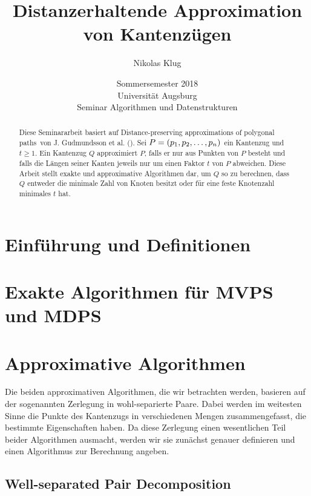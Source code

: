 \documentclass[11pt]{article}
\title{Distanzerhaltende Approximation von Kantenzügen}
\author{Nikolas Klug}
\date{Sommersemester 2018
	\\ Universität Augsburg
	\\ Seminar Algorithmen und Datenstrukturen
	}
\begin{document}
    \maketitle

    \begin{abstract}
        Diese Seminararbeit basiert auf \glqq Distance-preserving approximations of polygonal paths\grqq\ von J. Gudmundsson et al. (\cite{gudmundsson}). Sei $P = (p_1, p_2, \mathellipsis, p_n)$ ein Kantenzug und $t \geq 1$. Ein Kantenzug $Q$ approximiert $P$, falls er nur aus Punkten von $P$ besteht und falls die Längen seiner Kanten jeweils nur um einen Faktor $t$ von $P$ abweichen. Diese Arbeit stellt exakte und approximative Algorithmen dar, um $Q$ so zu berechnen, dass $Q$ entweder die minimale Zahl von Knoten besitzt oder für eine feste Knotenzahl 
        minimales $t$ hat.
    \end{abstract}

    \section{Einführung und Definitionen}
    \label{sec:intro}
	

    \section{Exakte Algorithmen für MVPS und MDPS}
    \label{sec:exact}
    
    
    \section{Approximative Algorithmen}
    \label{sec:approximative}
    
    Die beiden approximativen Algorithmen, die wir betrachten werden, basieren auf der sogenannten Zerlegung in wohl-separierte Paare. Dabei werden im weitesten Sinne die Punkte des Kantenzugs in verschiedenen Mengen zusammengefasst, die bestimmte Eigenschaften haben. Da diese Zerlegung einen wesentlichen Teil beider Algorithmen ausmacht, werden wir sie zunächst genauer definieren und einen Algorithmus zur Berechnung angeben.

    \subsection{Well-separated Pair Decomposition}
    \label{subsec:wspd}
    
    
\end{document}
